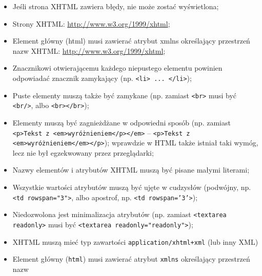 \begin{itemize}
\item Jeśli strona XHTML zawiera błędy, nie może zostać wyświetlona;
\item Strony XHTML: \url{http://www.w3.org/1999/xhtml};
\item Element główny (html) musi zawierać atrybut xmlns określający przestrzeń nazw XHTML: \url{http://www.w3.org/1999/xhtml};
\item Znacznikowi otwierającemu każdego niepustego elementu powinien odpowiadać znacznik zamykający (np. \texttt{<li> ... </li>});
\item Puste elementy muszą także być zamykane (np. zamiast \texttt{<br>} musi być \texttt{<br/>}, albo \texttt{<br></br>});
\item Elementy muszą być zagnieżdżane w odpowiedni sposób (np. zamiast \texttt{<p>Tekst z <em>wyróżnieniem</p></em>} -- \texttt{<p>Tekst z <em>wyróżnieniem</em></p>}); wprawdzie w HTML także istniał taki wymóg, lecz nie był egzekwowany przez przeglądarki;
\item Nazwy elementów i atrybutów XHTML muszą być pisane małymi literami;
\item Wszystkie wartości atrybutów muszą być ujęte w cudzysłów (podwójny, np. \texttt{<td rowspan="3">}, albo apostrof, np. \texttt{<td rowspan='3'>});
\item Niedozwolona jest minimalizacja atrybutów (np. zamiast \texttt{<textarea readonly>} musi być \texttt{<textarea readonly="readonly">});
\item XHTML muszą mieć typ zawartości \texttt{application/xhtml+xml} (lub inny XML)
\item Element główny (\texttt{html}) musi zawierać atrybut \texttt{xmlns} określający przestrzeń nazw  
\end{itemize}
